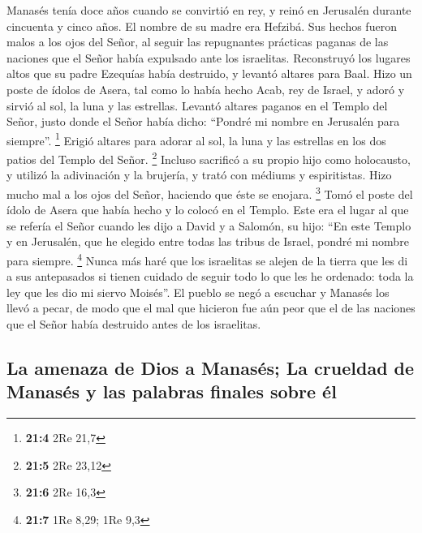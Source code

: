  Manasés tenía doce años cuando se convirtió en rey, y
reinó en Jerusalén durante cincuenta y cinco años. El nombre de su madre
era Hefzibá.  Sus hechos fueron malos a los ojos del
Señor, al seguir las repugnantes prácticas paganas de las naciones que
el Señor había expulsado ante los israelitas.  Reconstruyó
los lugares altos que su padre Ezequías había destruido, y levantó
altares para Baal. Hizo un poste de ídolos de Asera, tal como lo había
hecho Acab, rey de Israel, y adoró y sirvió al sol, la luna y las
estrellas.  Levantó altares paganos en el Templo del
Señor, justo donde el Señor había dicho: ``Pondré mi nombre en Jerusalén
para siempre''. \footnote{\textbf{21:4} 2Re 21,7}  Erigió
altares para adorar al sol, la luna y las estrellas en los dos patios
del Templo del Señor. \footnote{\textbf{21:5} 2Re 23,12} 
Incluso sacrificó a su propio hijo como holocausto, y utilizó la
adivinación y la brujería, y trató con médiums y espiritistas. Hizo
mucho mal a los ojos del Señor, haciendo que éste se enojara.
\footnote{\textbf{21:6} 2Re 16,3}  Tomó el poste del ídolo
de Asera que había hecho y lo colocó en el Templo. Este era el lugar al
que se refería el Señor cuando les dijo a David y a Salomón, su hijo:
``En este Templo y en Jerusalén, que he elegido entre todas las tribus
de Israel, pondré mi nombre para siempre. \footnote{\textbf{21:7} 1Re
  8,29; 1Re 9,3}  Nunca más haré que los israelitas se
alejen de la tierra que les di a sus antepasados si tienen cuidado de
seguir todo lo que les he ordenado: toda la ley que les dio mi siervo
Moisés''.  El pueblo se negó a escuchar y Manasés los
llevó a pecar, de modo que el mal que hicieron fue aún peor que el de
las naciones que el Señor había destruido antes de los israelitas.

\hypertarget{la-amenaza-de-dios-a-manasuxe9s-la-crueldad-de-manasuxe9s-y-las-palabras-finales-sobre-uxe9l}{%
\subsection{La amenaza de Dios a Manasés; La crueldad de Manasés y las
palabras finales sobre
él}\label{la-amenaza-de-dios-a-manasuxe9s-la-crueldad-de-manasuxe9s-y-las-palabras-finales-sobre-uxe9l}}

